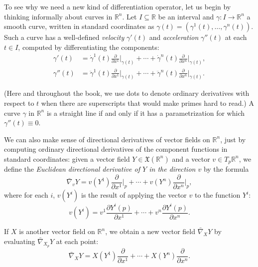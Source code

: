 To see why we need a new kind of differentiation operator, let us begin by thinking informally about curves in $\mathbb{R}^n$. Let $I\subseteq\mathbb{R}$ be an interval and $\gamma\colon I\to\mathbb{R}^n$ a smooth curve, written in standard coordinates as $\gamma(t)=(\gamma^1(t),\ldots,\gamma^n(t))$. Such a curve has a well-defined \emph{velocity} $\gamma'(t)$ and \emph{acceleration} $\gamma''(t)$ at each $t \in I$, computed by differentiating the components:
\begin{align}
\gamma'(t) &= \dot{\gamma}^1(t) \frac{\partial}{\partial x^1}\bigg|_{\gamma(t)} + \cdots + \dot{\gamma}^n(t) \frac{\partial}{\partial x^n}\bigg|_{\gamma(t)}, \label{eq:4.1}\\
\gamma''(t) &= \ddot{\gamma}^1(t) \frac{\partial}{\partial x^1}\bigg|_{\gamma(t)} + \cdots + \ddot{\gamma}^n(t) \frac{\partial}{\partial x^n}\bigg|_{\gamma(t)}. \label{eq:4.2}
\end{align}

(Here and throughout the book, we use dots to denote ordinary derivatives with respect to $t$ when there are superscripts that would make primes hard to read.) A curve $\gamma$ in $\mathbb{R}^n$ is a straight line if and only if it has a parametrization for which $\gamma''(t) \equiv 0$.

We can also make sense of directional derivatives of vector fields on $\mathbb{R}^n$, just by computing ordinary directional derivatives of the component functions in standard coordinates: given a vector field $Y \in \mathfrak{X}(\mathbb{R}^n)$ and a vector $v \in T_p\mathbb{R}^n$, we define the \emph{Euclidean directional derivative of $Y$ in the direction $v$} by the formula
\[
\bar{\nabla}_v Y = v(Y^1) \frac{\partial}{\partial x^1}\bigg|_p + \cdots + v(Y^n) \frac{\partial}{\partial x^n}\bigg|_p,
\]
where for each $i$, $v(Y^i)$ is the result of applying the vector $v$ to the function $Y^i$:
\[
v(Y^i) = v^1 \frac{\partial Y^i(p)}{\partial x^1} + \cdots + v^n \frac{\partial Y^i(p)}{\partial x^n}.
\]

If $X$ is another vector field on $\mathbb{R}^n$, we obtain a new vector field $\bar{\nabla}_X Y$ by evaluating $\bar{\nabla}_{X_p} Y$ at each point:
\begin{equation}
\bar{\nabla}_X Y = X(Y^1) \frac{\partial}{\partial x^1} + \cdots + X(Y^n) \frac{\partial}{\partial x^n}. \tag{4.3}
\end{equation}

